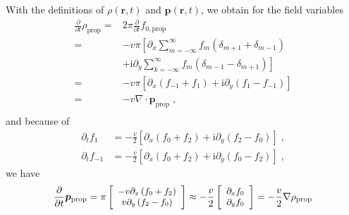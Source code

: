 \documentclass[a4paper, amsfonts, amssymb, amsmath, reprint, showkeys, showpacs, nofootinbib, twoside]{revtex4-2}
\begin{document}
With the definitions of $\rho \left( \mathbf{r},t \right)$ and $\boldsymbol{p}\left( \mathbf{r},t \right)$, we obtain for the field variables
\begin{equation}
    \begin{aligned}
        \frac{\partial}{\partial t}\rho _{\mathrm{prop}}=&2\pi \frac{\partial}{\partial t}f_{0,\mathrm{prop}}\\
        =&-v\pi \left[ \partial _x\sum_{m=-\infty}^{\infty}{f_m\left( \delta _{m+1}+\delta _{m-1} \right)} \right.\\
        &\left. +\mathrm{i}\partial _y\sum_{k=-\infty}^{\infty}{f_m\left( \delta _{m-1}-\delta _{m+1} \right)} \right]\\
        =&-v\pi \left[ \partial _x\left( f_{-1}+f_1 \right) +\mathrm{i}\partial _y\left( f_1-f_{-1} \right) \right]\\
        =&-v\nabla \cdot \boldsymbol{p}_{\mathrm{prop}}\;,\\
    \end{aligned}
\end{equation}
and because of 
\begin{subequations}
    \begin{align}
        \partial _tf_{1}&=-\frac{v}{2}\left[ \partial _x\left( f_{0}+f_{2} \right) +\mathrm{i}\partial _y\left( f_{2}-f_{0} \right) \right] \;,\\
        \partial _tf_{-1}&=-\frac{v}{2}\left[ \partial _x\left( f_{0}+f_{2} \right) +\mathrm{i}\partial _y\left( f_{0}-f_{2} \right) \right] \;,
    \end{align}
\end{subequations}
we have
\begin{equation}
    \small
    \frac{\partial}{\partial t}\boldsymbol{p}_{\mathrm{prop}}=\pi \left[ \begin{array}{c}
        -v\partial _x\left( f_{0}+f_{2} \right)\\
        v\partial _y\left( f_{2}-f_{0} \right)\\
    \end{array} \right] \approx -\frac{v}{2}\left[ \begin{array}{c}
        \partial _xf_{0}\\
        \partial _yf_{0}\\
    \end{array} \right] =-\frac{v}{2}\nabla \rho _{\mathrm{prop}}
\end{equation}
\end{document}
